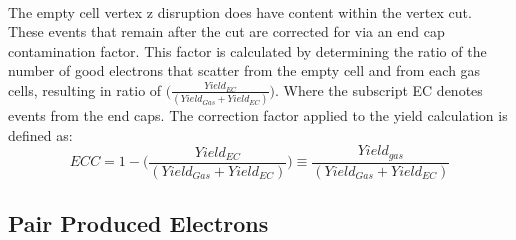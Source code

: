 \paragraph{}The empty cell vertex z disruption does have content within the vertex cut. These events that remain after the cut are corrected for via an end cap contamination factor. This  factor is calculated by determining the ratio of the number of good electrons that scatter from the empty cell and from each gas cells, resulting in ratio of $\big(\frac{Yield_{EC}}{(Yield_{Gas} + Yield_{EC})}\big)$. Where the subscript EC denotes events from the end caps. The correction factor applied to the yield calculation is defined as:
\begin{equation*}
ECC = 1- \big(\frac{Yield_{EC}}{(Yield_{Gas} + Yield_{EC})}\big) \equiv \frac{Yield_{gas}}{(Yield_{Gas} + Yield_{EC})}
\end{equation*}




\subsection{Pair Produced Electrons}
